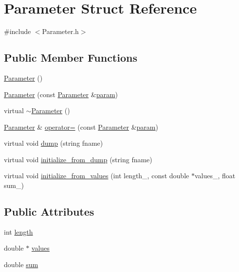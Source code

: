 \hypertarget{struct_parameter}{
\section{Parameter Struct Reference}
\label{struct_parameter}
}


{\ttfamily \#include $<$Parameter.h$>$}

\subsection*{Public Member Functions}
\begin{DoxyCompactItemize}
\item 
\hyperlink{struct_parameter_a5ba93ca36c3261d3850e67f92717c2f5}{Parameter} ()
\item 
\hyperlink{struct_parameter_af74ffe8ba8d86ce71d061a2147d54f46}{Parameter} (const \hyperlink{struct_parameter}{Parameter} \&\hyperlink{struct_parameter}{param})
\item 
virtual \hyperlink{struct_parameter_a6e2ade42a712f1d3675653329266e42d}{$\sim$Parameter} ()
\item 
\hyperlink{struct_parameter}{Parameter} \& \hyperlink{struct_parameter_adb1df6ea6fccec000753226f28957f3a}{operator=} (const \hyperlink{struct_parameter}{Parameter} \&\hyperlink{struct_parameter}{param})
\item 
virtual void \hyperlink{struct_parameter_a9196971fa12b28330c9baef92671ed70}{dump} (string fname)
\item 
virtual void \hyperlink{struct_parameter_a7af368f9019c0d7591b5cd783222b051}{initialize\_\-from\_\-dump} (string fname)
\item 
virtual void \hyperlink{struct_parameter_a3f4dc4990a4301f103d606060ab0a1b1}{initialize\_\-from\_\-values} (int length\_\-, const double $\ast$values\_\-, float sum\_\-)
\end{DoxyCompactItemize}
\subsection*{Public Attributes}
\begin{DoxyCompactItemize}
\item 
int \hyperlink{struct_parameter_ad700759feb1ec5b3e03edf7adf375e29}{length}
\item 
double $\ast$ \hyperlink{struct_parameter_aeb2a5bbab553c19dc910c1d1e19eb73d}{values}
\item 
double \hyperlink{struct_parameter_a17e743cd43b792d51b704a0fb596d734}{sum}
\end{DoxyCompactItemize}


